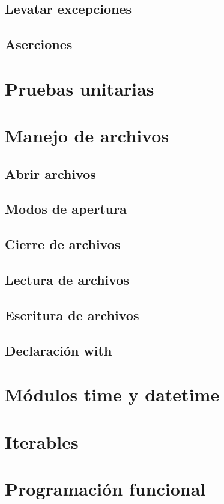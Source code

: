 \documentclass{article}
\begin{document}
      \subsection{Levatar excepciones}
      \subsection{Aserciones}

    \section{Pruebas unitarias}

    \section{Manejo de archivos}

      \subsection{Abrir archivos}
      \subsection{Modos de apertura}
      \subsection{Cierre de archivos}
      \subsection{Lectura de archivos}
      \subsection{Escritura de archivos}
      \subsection{Declaración with}

    \section{Módulos time y datetime}

    \section{Iterables}

    \section{Programación funcional}
\end{document}
